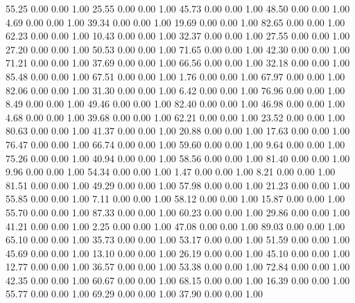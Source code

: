    55.25   0.00   0.00   1.00
   25.55   0.00   0.00   1.00
   45.73   0.00   0.00   1.00
   48.50   0.00   0.00   1.00
    4.69   0.00   0.00   1.00
   39.34   0.00   0.00   1.00
   19.69   0.00   0.00   1.00
   82.65   0.00   0.00   1.00
   62.23   0.00   0.00   1.00
   10.43   0.00   0.00   1.00
   32.37   0.00   0.00   1.00
   27.55   0.00   0.00   1.00
   27.20   0.00   0.00   1.00
   50.53   0.00   0.00   1.00
   71.65   0.00   0.00   1.00
   42.30   0.00   0.00   1.00
   71.21   0.00   0.00   1.00
   37.69   0.00   0.00   1.00
   66.56   0.00   0.00   1.00
   32.18   0.00   0.00   1.00
   85.48   0.00   0.00   1.00
   67.51   0.00   0.00   1.00
    1.76   0.00   0.00   1.00
   67.97   0.00   0.00   1.00
   82.06   0.00   0.00   1.00
   31.30   0.00   0.00   1.00
    6.42   0.00   0.00   1.00
   76.96   0.00   0.00   1.00
    8.49   0.00   0.00   1.00
   49.46   0.00   0.00   1.00
   82.40   0.00   0.00   1.00
   46.98   0.00   0.00   1.00
    4.68   0.00   0.00   1.00
   39.68   0.00   0.00   1.00
   62.21   0.00   0.00   1.00
   23.52   0.00   0.00   1.00
   80.63   0.00   0.00   1.00
   41.37   0.00   0.00   1.00
   20.88   0.00   0.00   1.00
   17.63   0.00   0.00   1.00
   76.47   0.00   0.00   1.00
   66.74   0.00   0.00   1.00
   59.60   0.00   0.00   1.00
    9.64   0.00   0.00   1.00
   75.26   0.00   0.00   1.00
   40.94   0.00   0.00   1.00
   58.56   0.00   0.00   1.00
   81.40   0.00   0.00   1.00
    9.96   0.00   0.00   1.00
   54.34   0.00   0.00   1.00
    1.47   0.00   0.00   1.00
    8.21   0.00   0.00   1.00
   81.51   0.00   0.00   1.00
   49.29   0.00   0.00   1.00
   57.98   0.00   0.00   1.00
   21.23   0.00   0.00   1.00
   55.85   0.00   0.00   1.00
    7.11   0.00   0.00   1.00
   58.12   0.00   0.00   1.00
   15.87   0.00   0.00   1.00
   55.70   0.00   0.00   1.00
   87.33   0.00   0.00   1.00
   60.23   0.00   0.00   1.00
   29.86   0.00   0.00   1.00
   41.21   0.00   0.00   1.00
    2.25   0.00   0.00   1.00
   47.08   0.00   0.00   1.00
   89.03   0.00   0.00   1.00
   65.10   0.00   0.00   1.00
   35.73   0.00   0.00   1.00
   53.17   0.00   0.00   1.00
   51.59   0.00   0.00   1.00
   45.69   0.00   0.00   1.00
   13.10   0.00   0.00   1.00
   26.19   0.00   0.00   1.00
   45.10   0.00   0.00   1.00
   12.77   0.00   0.00   1.00
   36.57   0.00   0.00   1.00
   53.38   0.00   0.00   1.00
   72.84   0.00   0.00   1.00
   42.35   0.00   0.00   1.00
   60.67   0.00   0.00   1.00
   68.15   0.00   0.00   1.00
   16.39   0.00   0.00   1.00
   55.77   0.00   0.00   1.00
   69.29   0.00   0.00   1.00
   37.90   0.00   0.00   1.00
